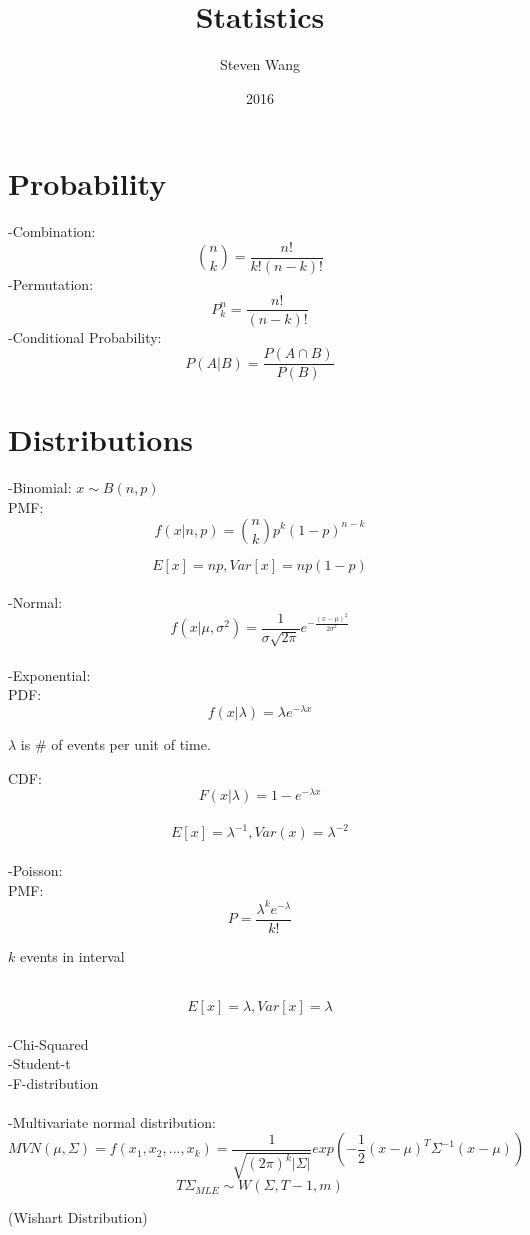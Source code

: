 \documentclass[12pt]{article}
\begin{document}
\title{Statistics}
\author{Steven Wang}
\date{2016}
\maketitle

\tableofcontents


\section{Probability}
-Combination:\\
$${n \choose k}=\frac{n!}{k!(n-k)!}$$
-Permutation:\\
$$P_k^n=\frac{n!}{(n-k)!}$$
-Conditional Probability:
$$P(A|B)=\frac{P(A\cap B)}{P(B)}$$

\section{Distributions}
-Binomial:    $x \sim B(n,p)$
\\

PMF:\\
$$f(x|n,p)={n \choose k} p^k (1-p)^{n-k}$$

$$E[x]=np, Var[x]=np(1-p)$$
\\
-Normal:\\
$$f(x|\mu,\sigma^2)=\frac{1}{\sigma\sqrt{2\pi}}e^{-\frac{(x-\mu)^2}{2\sigma^2}}$$
\\
-Exponential:\\

PDF:\\
$$f(x|\lambda)=\lambda e^{-\lambda x}$$
\centerline{$\lambda$ is \# of events per unit of time.}

CDF:\\
$$F(x|\lambda)=1-e^{-\lambda x}$$
\\
$$E[x]=\lambda^{-1}, Var(x)=\lambda^{-2}$$
\\
-Poisson:\\

PMF:
$$P=\frac{\lambda^ke^{-\lambda}}{k!}$$
\centerline{$k$ events in interval}
\\
$$E[x]=\lambda, Var[x]=\lambda$$
\\
-Chi-Squared\\
-Student-t\\
-F-distribution\\
\\
-Multivariate normal distribution:
\\
$$MVN(\mu,\Sigma)=f(x_1,x_2,...,x_k)=\frac{1}{\sqrt{(2\pi)^k|\Sigma|}}exp(-\frac{1}{2}(x-\mu)^T \Sigma^{-1}(x-\mu))$$
$$T\Sigma_{MLE} \sim W(\Sigma,T-1,m)$$
\centerline{(Wishart Distribution)}
\\
\end{document}
